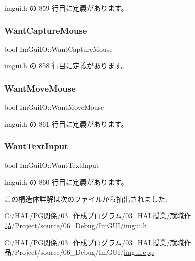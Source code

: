  imgui.\+h の 859 行目に定義があります。

\mbox{\label{struct_im_gui_i_o_af5b8add76c5d833a65df19b5456acd7e}} 
\subsubsection{\texorpdfstring{Want\+Capture\+Mouse}{WantCaptureMouse}}
{\footnotesize\ttfamily bool Im\+Gui\+I\+O\+::\+Want\+Capture\+Mouse}



 imgui.\+h の 858 行目に定義があります。

\mbox{\label{struct_im_gui_i_o_a0bd366ca18e78bf58f674a355189eaf3}} 
\subsubsection{\texorpdfstring{Want\+Move\+Mouse}{WantMoveMouse}}
{\footnotesize\ttfamily bool Im\+Gui\+I\+O\+::\+Want\+Move\+Mouse}



 imgui.\+h の 861 行目に定義があります。

\mbox{\label{struct_im_gui_i_o_a0e53197e96187a57b2d86720bf163f4d}} 
\subsubsection{\texorpdfstring{Want\+Text\+Input}{WantTextInput}}
{\footnotesize\ttfamily bool Im\+Gui\+I\+O\+::\+Want\+Text\+Input}



 imgui.\+h の 860 行目に定義があります。



この構造体詳解は次のファイルから抽出されました\+:\begin{DoxyCompactItemize}
\item 
C\+:/\+H\+A\+L/\+P\+G関係/03\+\_\+作成プログラム/03\+\_\+\+H\+A\+L授業/就職作品/\+Project/source/06\+\_\+\+Debug/\+Im\+G\+U\+I/\mbox{\hyperlink{imgui_8h}{imgui.\+h}}\item 
C\+:/\+H\+A\+L/\+P\+G関係/03\+\_\+作成プログラム/03\+\_\+\+H\+A\+L授業/就職作品/\+Project/source/06\+\_\+\+Debug/\+Im\+G\+U\+I/\mbox{\hyperlink{imgui_8cpp}{imgui.\+cpp}}\end{DoxyCompactItemize}
